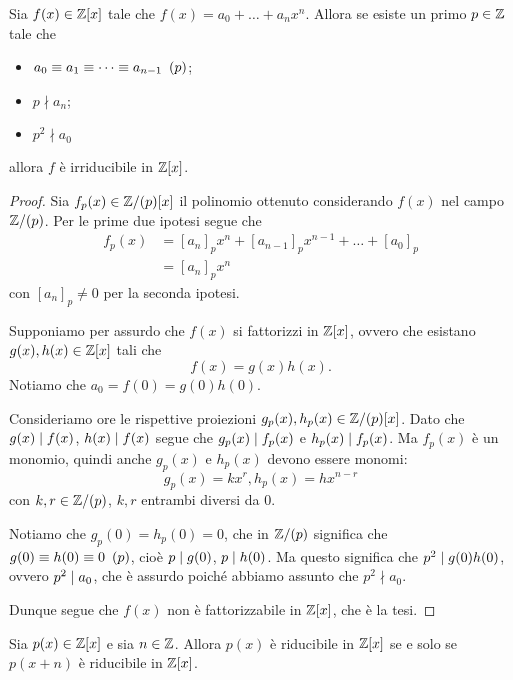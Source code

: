 \begin{proposition}
     \label{criterio_eisenstein}
    Sia $f(x) \in \mathbb{Z}[x]$ tale che $f(x) = a_0 + \dots + a_nx^n$. Allora se esiste un primo $p \in \mathbb{Z}$ tale che \begin{itemize}
        \item $a_0 \equiv a_1 \equiv \dots \equiv a_{n-1} \ \left(p\right)$;
        \item $p \nmid a_n$;
        \item $p^2 \nmid a_0$
    \end{itemize}
    allora $f$ è irriducibile in $\mathbb{Z}[x]$.
\end{proposition}
\begin{proof}
    Sia $f_p(x) \in \mathbb{Z}/(p)[x]$ il polinomio ottenuto considerando $f(x)$ nel campo $\mathbb{Z}/(p)$. Per le prime due ipotesi segue che \begin{align*}
        f_p(x) &= [a_n]_px^n + [a_{n-1}]_px^{n-1} + \dots + [a_0]_p \\
        &= [a_n]_px^n
    \end{align*} con $[a_n]_p \neq 0$ per la seconda ipotesi.

    Supponiamo per assurdo che $f(x)$ si fattorizzi in $\mathbb{Z}[x]$, ovvero che esistano $g(x), h(x) \in \mathbb{Z}[x]$ tali che \[
        f(x) = g(x)h(x).
    \] Notiamo che $a_0 = f(0) = g(0)h(0)$. 
    
    Consideriamo ore le rispettive proiezioni $g_p(x), h_p(x) \in \mathbb{Z}/(p)[x]$. Dato che $g(x) \mid f(x)$, $h(x) \mid f(x)$ segue che $g_p(x) \mid f_p(x)$ e $h_p(x) \mid f_p(x)$. Ma $f_p(x)$ è un monomio, quindi anche $g_p(x)$ e $h_p(x)$ devono essere monomi:
    \[
        g_p(x) = kx^r, h_p(x) = hx^{n-r}    
    \] con $k, r \in \mathbb{Z}/(p)$, $k, r$ entrambi diversi da $0$.

    Notiamo che $g_p(0) = h_p(0) = 0$, che in $\mathbb{Z}/(p)$ significa che $g(0) \equiv h(0) \equiv 0 \ \left(p\right)$, cioè $p \mid g(0)$, $p \mid h(0)$. Ma questo significa che $p^2 \mid g(0)h(0)$, ovvero $p^2 \mid a_0$, che è assurdo poiché abbiamo assunto che $p^2 \nmid a_0$.

    Dunque segue che $f(x)$ non è fattorizzabile in $\mathbb{Z}[x]$, che è la tesi.
\end{proof}

\begin{proposition}
     \label{criterio_sost}
    Sia $p(x) \in \mathbb{Z}[x]$ e sia $n \in \mathbb{Z}$. Allora $p(x)$ è riducibile in $\mathbb{Z}[x]$ se e solo se $p(x+n)$ è riducibile in $\mathbb{Z}[x]$.
\end{proposition}


